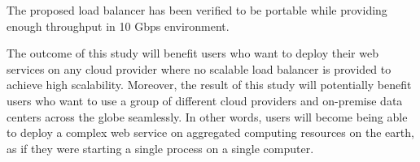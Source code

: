 The proposed load balancer has been verified to be portable while providing enough throughput in 10 Gbps environment.

The outcome of this study will benefit users who want to deploy their web services on any cloud provider where no scalable load balancer is provided to achieve high scalability.
Moreover, the result of this study will potentially benefit users who want to use a group of different cloud providers and on-premise data centers across the globe seamlessly.
In other words, users will become being able to deploy a complex web service on aggregated computing resources on the earth, as if they were starting a single process on a single computer.

